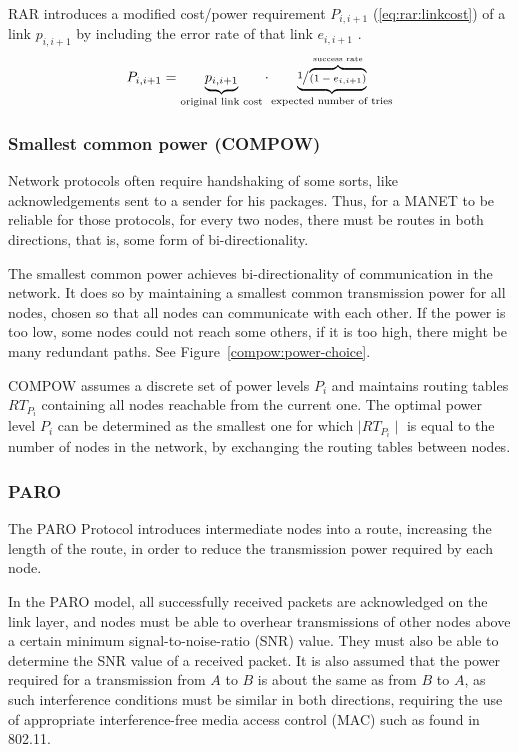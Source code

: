 RAR\cite{banerjee2002minimum} introduces a modified cost/power requirement
$P_{i,i+1}$ (\ref{eq:rar:linkcost}) of a link $p_{i,i+1}$ by including the error
rate of that link $e_{i,i+1}$ .
\begin{align}\label{eq:rar:linkcost}
  P_{i,i+1} = \underbrace{p_{i,i+1}}_{\text{original link cost}} \cdot \underbrace{\sfrac{1}{\overbrace{(1-e_{i,i+1})}^{\text{success rate}}}}_{\text{expected number of tries}}
\end{align} 

\subsubsection{Smallest common power (COMPOW)}
Network protocols often require handshaking of some sorts, like acknowledgements
sent to a sender for his packages. Thus, for a MANET to be reliable for those
protocols, for every two nodes, there must be routes in both directions, that
is, some form of bi-directionality.

The smallest common power\cite{narayanaswamy2002power} achieves bi-directionality
of communication in the network.
It does so by maintaining a smallest common transmission power for all nodes,
chosen so that all nodes can communicate with each other. If the power is too
low, some nodes could not reach some others, if it is too high, there might be
many redundant paths. See Figure~\ref{compow:power-choice}.

COMPOW assumes a discrete set of power levels $P_{i}$ and maintains routing
tables ${RT}_{P_{i}}$ containing all nodes reachable from the current one. The
optimal power level $P_{i}$ can be determined as the smallest one for which
$\mid RT_{P_{i}} \mid$ is equal to the number of nodes in the network, by
exchanging the routing tables between nodes.

\subsubsection{PARO}
The PARO Protocol\cite{gomez2003paro} introduces intermediate nodes into a
route, increasing the length of the route, in order to reduce the transmission
power required by each node.

In the PARO model, all successfully received packets are acknowledged on the
link layer, and nodes must be able to overhear transmissions of other nodes
above a certain minimum signal-to-noise-ratio (SNR) value. They must also
be able to determine the SNR value of a received packet. It is also assumed
that the power required for a transmission from $A$ to $B$ is about the same
as from $B$ to $A$, as such interference conditions must be similar in both
directions, requiring the use of appropriate interference-free media access
control (MAC) such as found in 802.11.

